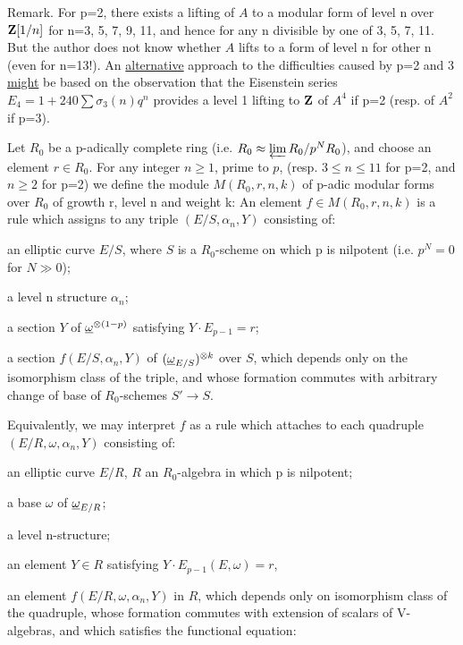 \begin{kathmstar}{Remark.}
For p=2, there exists a lifting of $A$ to a modular form of level n over
$\mathbf{Z}[1/n]$ for n=3, 5, 7, 9, 11, and hence for any n divisible by one of
3, 5, 7, 11. But the author does not know whether $A$ lifts to a form of level n
for other n (even for n=13!). An \uline{alternative} approach to the
difficulties caused by p=2 and 3 \uline{might} be based on the observation that
the Eisenstein series $E_4 = 1 + 240\sum \sigma_3(n)q^n$ provides a level 1
lifting to $\mathbf{Z}$ of $A^4$ if p=2 (resp. of $A^2$ if p=3).
\end{kathmstar}


 Let $R_0$ be a p-adically complete ring (i.e.
$R_0\approx\varprojlim R_0/p^N R_0$), and choose an element $r\in R_0$. For any
integer $n\geq 1$, prime to $p$, (resp. $3\leq n\leq 11$ for p=2, and
$n\geq 2$ for p=2) we define the module $M(R_0,r,n,k)$ of p-adic modular forms
over $R_0$ of growth r, level n and weight k: An element
$f\in M(R_0,r,n,k)$ is a rule which assigns to any triple $(E/S,\alpha_n,Y)$
consisting of:

 an elliptic curve $E/S$, where $S$ is a $R_0$-scheme on which p
is nilpotent (i.e. $p^N=0$ for $N\gg 0$);

 a level n structure $\alpha_n$;

 a section $Y$ of $\underline{\omega}^{\otimes(1-p)}$ satisfying
$Y\cdot E_{p-1}=r$;

a section $f(E/S,\alpha_n,Y)$ of $(\underline{\omega}_{E/S})^{\otimes k}$ over $S$, which
depends only on the isomorphism class of the triple, and whose formation
commutes with arbitrary change of base of $R_0$-schemes $S'\to S$.

Equivalently, we may interpret $f$ as a rule which attaches to each quadruple
$(E/R,\omega,\alpha_n,Y)$ consisting of:

 an elliptic curve $E/R$, $R$ an $R_0$-algebra in which p is
nilpotent;

 a base $\omega$ of $\underline{\omega}_{E/R}$;

 a level n-structure;

 an element $Y\in R$ satisfying $Y\cdot E_{p-1}(E,\omega)=r$,

an element $f(E/R,\omega,\alpha_n,Y)$ in $R$, which depends only on isomorphism
class of the quadruple, whose formation commutes with extension of scalars of
V-algebras, and which satisfies the functional equation:

